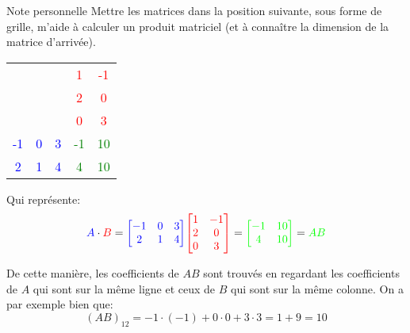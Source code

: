 \documentclass[a4paper]{article}
\begin{document}
\begin{parag}{Note personnelle}
     Mettre les matrices dans la position suivante, sous forme de grille, m'aide à calculer un produit matriciel (et à connaître la dimension de la matrice d'arrivée).

    \begin{center}
    \begin{tabular}{ccc||cc}
        & & & \textcolor{red}{1} & \textcolor{red}{-1} \\
        & & & \textcolor{red}{2} &  \textcolor{red}{0} \\
        & & & \textcolor{red}{0} &  \textcolor{red}{3} \\
        \hline
        \hline
        \textcolor{blue}{-1} & \textcolor{blue}{0} & \textcolor{blue}{3} & \textcolor{green}{-1} & \textcolor{green}{10} \\
        \textcolor{blue}{2} & \textcolor{blue}{1} & \textcolor{blue}{4} & \textcolor{green}{4} & \textcolor{green}{10}
    \end{tabular}
    \end{center}

    Qui représente:
    \[{\color{blue}A} \cdot {\color{red}B} = {\color{blue}\begin{bmatrix} -1 & 0 & 3 \\ 2 & 1 & 4 \end{bmatrix} } {\color{red}\begin{bmatrix} 1 & -1 \\ 2 & 0 \\ 0 & 3 \end{bmatrix}} = {\color{green}\begin{bmatrix} -1 & 10 \\ 4 & 10 \end{bmatrix}} = {\color{green}AB}\]

    De cette manière, les coefficients de $AB$ sont trouvés en regardant les coefficients de $A$ qui sont sur la même ligne et ceux de $B$ qui sont sur la même colonne. On a par exemple bien que:
    \[\left(AB\right)_{12} = -1\cdot \left(-1\right) + 0\cdot 0 + 3\cdot 3 = 1 + 9 = 10\]
\end{parag}
\end{document}
